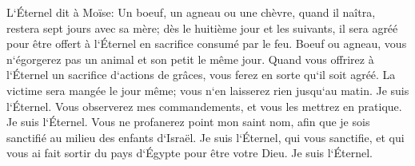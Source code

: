 \verse L`Éternel dit à Moïse: 
\verse Un boeuf, un agneau ou une chèvre, quand il naîtra, restera sept jours avec sa mère; dès le huitième jour et les suivants, il sera agréé pour être offert à l`Éternel en sacrifice consumé par le feu. 
\verse Boeuf ou agneau, vous n`égorgerez pas un animal et son petit le même jour. 
\verse Quand vous offrirez à l`Éternel un sacrifice d`actions de grâces, vous ferez en sorte qu`il soit agréé. 
\verse La victime sera mangée le jour même; vous n`en laisserez rien jusqu`au matin. Je suis l`Éternel. 
\verse Vous observerez mes commandements, et vous les mettrez en pratique. Je suis l`Éternel. 
\verse Vous ne profanerez point mon saint nom, afin que je sois sanctifié au milieu des enfants d`Israël. Je suis l`Éternel, qui vous sanctifie, 
\verse et qui vous ai fait sortir du pays d`Égypte pour être votre Dieu. Je suis l`Éternel. 

